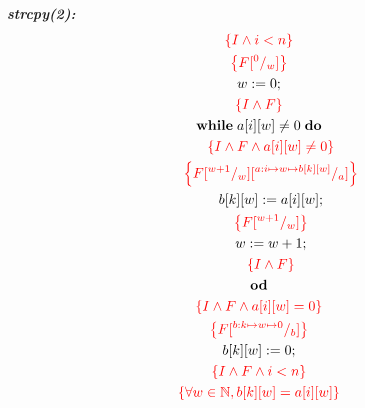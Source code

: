 \documentclass [a4paper, 12pt, fleqn]  {article}
\newcommand{\assn}[1]{{\color{red}\left\{#1\right\}}}
\begin{document}
\textit{\textbf{strcpy(2):}}
\begin{gather*}
\assn{I \AND i < n} \\
\assn{F \subst 0w}\\
w \Ass 0; \\
\assn{I \AND F} \\
\WHILE \hspace{0.1cm} a[i][w] \neq 0 \hspace{0.1cm} \DO \\
\hspace{0.6cm} \assn{I \AND F \AND a[i][w] \neq 0 }\\
\hspace{0.6cm} \assn{F \subst {w + 1} w \subst{ a:i \mapsto w \mapsto b[k][w]}  a    } \\
\hspace{0.6cm} b[k][w] \Ass a[i][w]; \\
\hspace{0.6cm} \assn{ F \subst {w + 1} w  } \\
\hspace{0.6cm} w \Ass w + 1; \\
\hspace{0.6cm} \assn{ I \AND F} \\
\OD \\
\assn{ I \AND F \AND  a[i][w] = 0 } \\
\assn{ F \subst {b: k \mapsto w \mapsto 0} b   } \\
b[k][w] \Ass 0; \\
\assn{I \AND F \AND i < n} \\
\assn{ \forall w \in \nat , b[k][w] = a[i][w]    } \\
\end{gather*}
\end{document}
